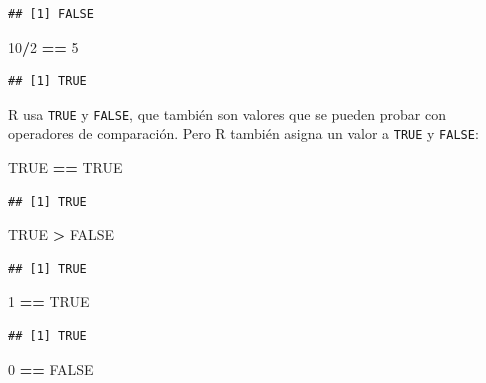 \documentclass[]{book}
\newenvironment{Shaded}{\begin{snugshade}}{\end{snugshade}}
\newcommand{\DecValTok}[1]{\textcolor[rgb]{0.00,0.00,0.81}{#1}}
\newcommand{\StringTok}[1]{\textcolor[rgb]{0.31,0.60,0.02}{#1}}
\newcommand{\OtherTok}[1]{\textcolor[rgb]{0.56,0.35,0.01}{#1}}
\newcommand{\OperatorTok}[1]{\textcolor[rgb]{0.81,0.36,0.00}{\textbf{#1}}}
\begin{document}
\begin{verbatim}
## [1] FALSE
\end{verbatim}

\begin{Shaded}
\begin{Highlighting}[]
\DecValTok{10}\OperatorTok{/}\DecValTok{2} \OperatorTok{==}\StringTok{ }\DecValTok{5}
\end{Highlighting}
\end{Shaded}

\begin{verbatim}
## [1] TRUE
\end{verbatim}

R usa \texttt{TRUE} y \texttt{FALSE}, que también son valores que se
pueden probar con operadores de comparación. Pero R también asigna un
valor a \texttt{TRUE} y \texttt{FALSE}:

\begin{Shaded}
\begin{Highlighting}[]
\OtherTok{TRUE} \OperatorTok{==}\StringTok{ }\OtherTok{TRUE}
\end{Highlighting}
\end{Shaded}

\begin{verbatim}
## [1] TRUE
\end{verbatim}

\begin{Shaded}
\begin{Highlighting}[]
\OtherTok{TRUE} \OperatorTok{>}\StringTok{ }\OtherTok{FALSE}
\end{Highlighting}
\end{Shaded}

\begin{verbatim}
## [1] TRUE
\end{verbatim}

\begin{Shaded}
\begin{Highlighting}[]
\DecValTok{1} \OperatorTok{==}\StringTok{ }\OtherTok{TRUE}
\end{Highlighting}
\end{Shaded}

\begin{verbatim}
## [1] TRUE
\end{verbatim}

\begin{Shaded}
\begin{Highlighting}[]
\DecValTok{0} \OperatorTok{==}\StringTok{ }\OtherTok{FALSE}
\end{Highlighting}
\end{Shaded}
\end{document}
